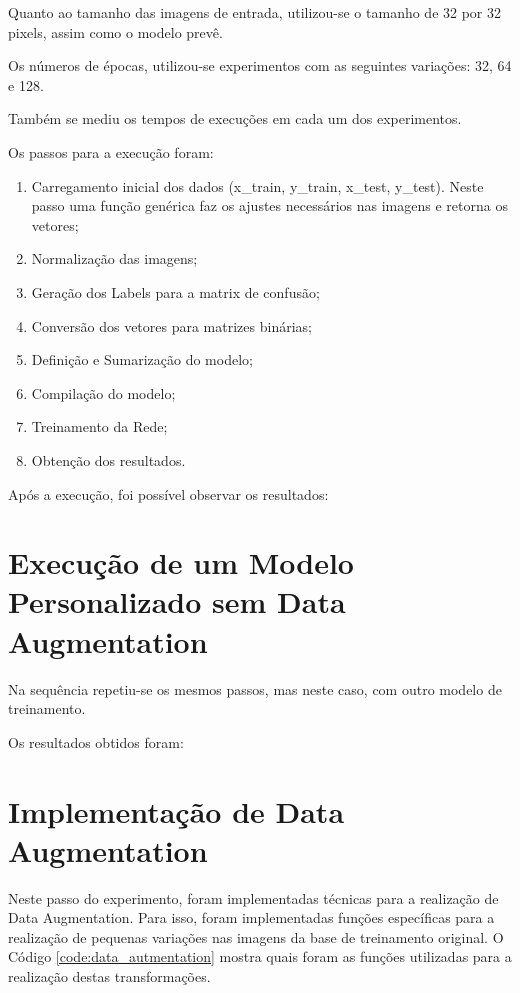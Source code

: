 \documentclass[12pt]{article}
\begin{document}
Quanto ao tamanho das imagens de entrada, utilizou-se o tamanho de 32 por 32 pixels, assim como o modelo prevê.

Os números de épocas, utilizou-se experimentos com as seguintes variações: 32, 64 e 128.

Também se mediu os tempos de execuções em cada um dos experimentos.

Os passos para a execução foram:

\begin{enumerate}
  \item Carregamento inicial dos dados (x\_train, y\_train, x\_test, y\_test). Neste passo uma função genérica faz os ajustes necessários nas imagens e retorna os vetores;
  \item Normalização das imagens;
  \item Geração dos Labels para a matrix de confusão;
  \item Conversão dos vetores para matrizes binárias;
  \item Definição e Sumarização do modelo;
  \item Compilação do modelo;
  \item Treinamento da Rede;
  \item Obtenção dos resultados.
\end{enumerate}

Após a execução, foi possível observar os resultados:

\section{Execução de um Modelo Personalizado sem Data Augmentation}

Na sequência repetiu-se os mesmos passos, mas neste caso, com outro modelo de treinamento.

Os resultados obtidos foram:

\section{Implementação de Data Augmentation}

Neste passo do experimento, foram implementadas técnicas para a realização de Data Augmentation. Para isso, foram implementadas funções específicas para a realização de pequenas variações nas imagens da base de treinamento original. O Código \ref{code:data_autmentation} mostra quais foram as funções utilizadas para a realização destas transformações.
\end{document}
